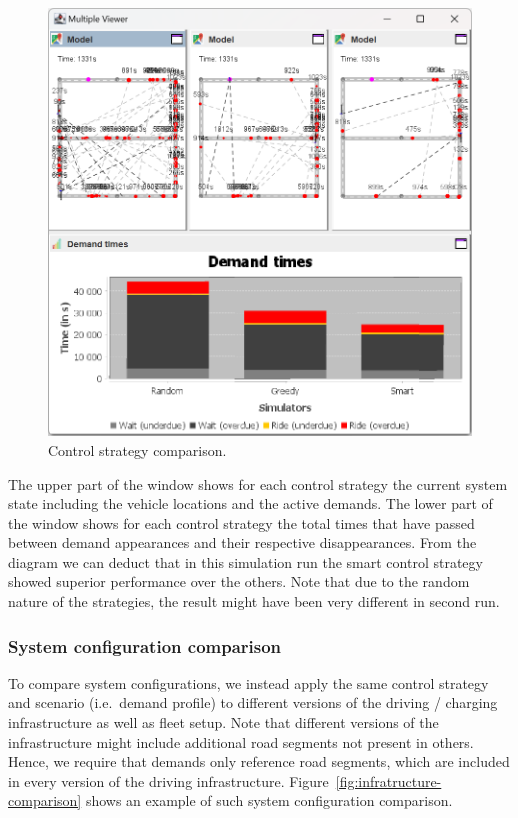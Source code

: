 \documentclass[a4paper,twoside]{article}
\begin{document}
	\begin{figure}[!ht]
		\includegraphics[width=\columnwidth]{controller_comparison.png}
		\caption{Control strategy comparison.}
		\label{fig:controller-comparison}
	\end{figure}
	
	The upper part of the window shows for each control strategy the current system state including the vehicle locations and the active demands.
	The lower part of the window shows for each control strategy the total times that have passed between demand appearances and their respective disappearances.
	From the diagram we can deduct that in this simulation run the smart control strategy showed superior performance over the others.
	Note that due to the random nature of the strategies, the result might have been very different in second run.
	
	\subsubsection{System configuration comparison}
	\label{sec:infrastructure-comparison}
	
	To compare system configurations, we instead apply the same control strategy and scenario (i.e.\ demand profile) to different versions of the driving / charging infrastructure as well as fleet setup.
	Note that different versions of the infrastructure might include additional road segments not present in others.
	Hence, we require that demands only reference road segments, which are included in every version of the driving infrastructure.
	Figure~\ref{fig:infratructure-comparison} shows an example of such system configuration comparison.
	
\end{document}
